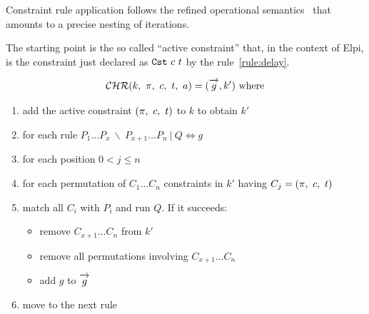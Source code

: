 \documentclass[a4paper, 11pt]{book}
\begin{document}
Constraint rule application follows the refined operational
semantics~\cite{10.1007/978-3-540-27775-0_7} that amounts to a precise nesting of iterations.

The starting point is the so called ``active constraint'' that, in the context of Elpi, is
the constraint just declared as $\texttt{Cst}\ c\ t$ by the rule~\cref{rule:delay}.

$$
\mathcal{CHR}(k,\ \prog,\ c,\ t,\ \alts) = (\vecL{g}, k')\ \mathrm{where}
$$
\begin{enumerate}
\item add the active constraint $(\prog,\ c,\ t)$ to $k$ to obtain $k'$
\item for each rule $P_1 \ldots P_x\ \backslash\ P_{x+1} \ldots P_n\ |\ Q \Leftrightarrow g$
\item for each position $0 < j \leq n$
\item for each permutation of $C_1 \ldots C_n$ constraints in $k'$ having $C_j = ({\pi},\ c,\ t)$
\item match all $C_i$ with $P_i$ and run $Q$. If it succeeds:
  \begin{itemize}
    \item remove $C_{x+1} \ldots C_n$ from $k'$
    \item remove all permutations involving $C_{x+1} \ldots C_n$
    \item add $g$ to $\vecL{g}$
  \end{itemize}
\item move to the next rule
\end{enumerate}
\end{document}
